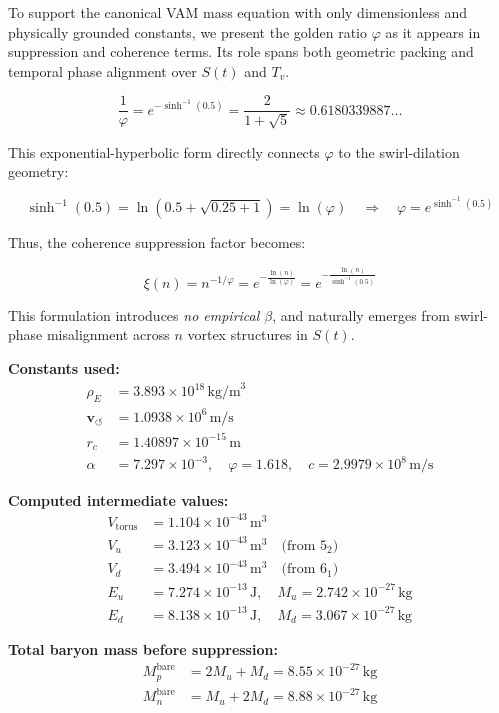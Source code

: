 \documentclass[12pt]{article}
\begin{document}
To support the canonical VAM mass equation with only dimensionless and physically grounded constants, we present the golden ratio $\varphi$ as it appears in suppression and coherence terms. Its role spans both geometric packing and temporal phase alignment over $S(t)$ and $T_v$.

\[
\boxed{
\frac{1}{\varphi} = e^{-\sinh^{-1}(0.5)} = \frac{2}{1 + \sqrt{5}} \approx 0.6180339887\ldots
}
\]

This exponential-hyperbolic form directly connects $\varphi$ to the swirl-dilation geometry:

\[
\sinh^{-1}(0.5) = \ln\left( 0.5 + \sqrt{0.25 + 1} \right) = \ln(\varphi)
\quad \Rightarrow \quad
\varphi = e^{\sinh^{-1}(0.5)}
\]

Thus, the coherence suppression factor becomes:

\[
\boxed{
\xi(n) = n^{-1/\varphi} = e^{-\frac{\ln(n)}{\ln(\varphi)}} = e^{-\frac{\ln(n)}{\sinh^{-1}(0.5)}}
}
\]

This formulation introduces \emph{no empirical $\beta$}, and naturally emerges from swirl-phase misalignment across $n$ vortex structures in $S(t)$.

\textbf{Constants used:}
\begin{align*}
\rho_{\scriptscriptstyle\boldsymbol\!E}&= 3.893 \times 10^{18} \, \text{kg/m}^3 \\
\mathbf{v}_{\scriptscriptstyle\boldsymbol{\circlearrowleft}} &= 1.0938 \times 10^6 \, \text{m/s} \\
r_c &= 1.40897 \times 10^{-15} \, \text{m} \\
\alpha &= 7.297 \times 10^{-3}, \quad \varphi = 1.618, \quad c = 2.9979 \times 10^8 \, \text{m/s}
\end{align*}

\textbf{Computed intermediate values:}
\begin{align*}
V_{\text{torus}} &= 1.104 \times 10^{-43} \, \text{m}^3 \\
V_u &= 3.123 \times 10^{-43} \, \text{m}^3 \quad \text{(from } 5_2 \text{)} \\
V_d &= 3.494 \times 10^{-43} \, \text{m}^3 \quad \text{(from } 6_1 \text{)} \\
E_u &= 7.274 \times 10^{-13} \, \text{J}, \quad M_u = 2.742 \times 10^{-27} \, \text{kg} \\
E_d &= 8.138 \times 10^{-13} \, \text{J}, \quad M_d = 3.067 \times 10^{-27} \, \text{kg}
\end{align*}

\textbf{Total baryon mass before suppression:}
\begin{align*}
M_p^{\text{bare}} &= 2M_u + M_d = 8.55 \times 10^{-27} \, \text{kg} \\
M_n^{\text{bare}} &= M_u + 2M_d = 8.88 \times 10^{-27} \, \text{kg}
\end{align*}
\end{document}
